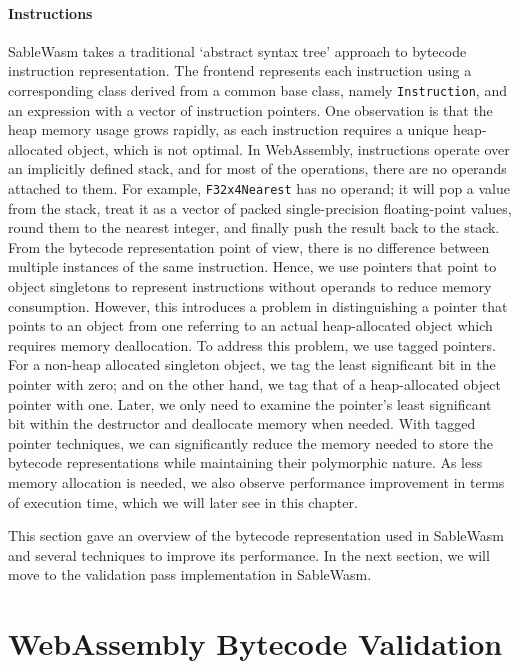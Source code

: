 \paragraph{Instructions}
SableWasm takes a traditional `abstract syntax tree' approach to bytecode
instruction representation. The frontend represents each instruction using a
corresponding class derived from a common base class, namely
\texttt{Instruction}, and an expression with a vector of instruction pointers.
One observation is that the heap memory usage grows rapidly, as each instruction
requires a unique heap-allocated object, which is not optimal. In WebAssembly,
instructions operate over an implicitly defined stack, and for most of the
operations, there are no operands attached to them. For example,
\texttt{F32x4Nearest} has no operand; it will pop a value from the stack, treat
it as a vector of packed single-precision floating-point values, round them to
the nearest integer, and finally push the result back to the stack. From the
bytecode representation point of view, there is no difference between multiple
instances of the same instruction. Hence, we use pointers that point to object
singletons to represent instructions without operands to reduce memory
consumption. However, this introduces a problem in distinguishing a pointer that
points to an object from one referring to an actual heap-allocated object which
requires memory deallocation. To address this problem, we use tagged pointers.
For a non-heap allocated singleton object, we tag the least significant bit in
the pointer with zero; and on the other hand, we tag that of a heap-allocated
object pointer with one. Later, we only need to examine the pointer's least
significant bit within the destructor and deallocate memory when needed. With
tagged pointer techniques, we can significantly reduce the memory needed to
store the bytecode representations while maintaining their polymorphic nature.
As less memory allocation is needed, we also observe performance improvement in
terms of execution time, which we will later see in this chapter.

This section gave an overview of the bytecode representation used in SableWasm
and several techniques to improve its performance. In the next section, we will
move to the validation pass implementation in SableWasm.

\section{WebAssembly Bytecode Validation}

